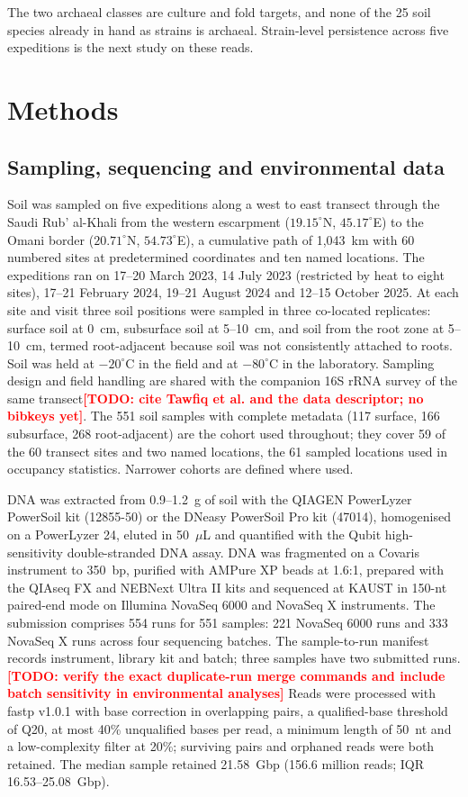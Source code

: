 \documentclass[11pt]{article}
\providecommand{\todo}[1]{\textcolor{red}{\textbf{[TODO: #1]}}}
\begin{document}
The two archaeal classes are culture and fold targets, and none of the 25 soil species already in
hand as strains is archaeal. Strain-level persistence across five expeditions is the next study on
these reads.

\section*{Methods}

\subsection*{Sampling, sequencing and environmental data}
Soil was sampled on five expeditions along a west to east transect through the Saudi Rub' al-Khali
from the western escarpment ($19.15^\circ$N, $45.17^\circ$E) to the Omani border ($20.71^\circ$N,
$54.73^\circ$E), a cumulative path of 1{,}043~km with 60 numbered sites at predetermined coordinates
and ten named locations. The expeditions ran on 17--20 March 2023, 14 July 2023 (restricted by heat
to eight sites), 17--21 February 2024, 19--21 August 2024 and 12--15 October 2025. At each site and
visit three soil positions were sampled in three co-located replicates: surface soil at 0~cm,
subsurface soil at 5--10~cm, and soil from the root zone at 5--10~cm, termed root-adjacent because
soil was not consistently attached to roots. Soil was held at $-20^\circ$C in the field and at
$-80^\circ$C in the laboratory. Sampling design and field handling are shared with the companion
16S rRNA survey of the same transect\todo{cite Tawfiq et al. and the data descriptor; no bibkeys
yet}. The 551 soil samples with complete metadata (117 surface, 166 subsurface, 268 root-adjacent)
are the cohort used throughout; they cover 59 of the 60 transect sites and two named locations, the
61 sampled locations used in occupancy statistics. Narrower cohorts are defined where used.

DNA was extracted from 0.9--1.2~g of soil with the QIAGEN PowerLyzer PowerSoil kit (12855-50) or the
DNeasy PowerSoil Pro kit (47014), homogenised on a PowerLyzer 24, eluted in 50~$\mu$L and quantified
with the Qubit high-sensitivity double-stranded DNA assay. DNA was fragmented on a Covaris instrument
to 350~bp, purified with AMPure XP beads at 1.6:1, prepared with the QIAseq FX and NEBNext Ultra II
kits and sequenced at KAUST in 150-nt paired-end mode on Illumina NovaSeq 6000 and NovaSeq X instruments.
The submission comprises 554 runs for 551 samples: 221 NovaSeq 6000 runs and 333 NovaSeq X runs
across four sequencing batches. The sample-to-run manifest records instrument, library kit and
batch; three samples have two submitted runs.\todo{verify the exact duplicate-run merge commands
and include batch sensitivity in environmental analyses} Reads were
processed with fastp v1.0.1 \citep{chen2018fastp} with base correction in overlapping pairs, a
qualified-base threshold of Q20, at most 40\% unqualified bases per read, a minimum length of 50~nt
and a low-complexity filter at 20\%; surviving pairs and orphaned reads were both retained. The
median sample retained 21.58~Gbp (156.6 million reads; IQR 16.53--25.08~Gbp).
\end{document}
